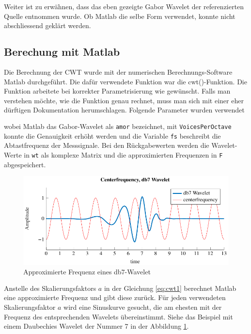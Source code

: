 \begin{refsection}
Weiter ist zu erwähnen, dass das eben gezeigte Gabor Wavelet der referenzierten Quelle entnommen wurde. Ob Matlab die selbe Form verwendet, konnte nicht abschliessend geklärt werden.

\subsection{Berechung mit Matlab}
\label{matlab}
Die Berechnung der CWT wurde mit der numerischen Berechnungs-Software Matlab durchgeführt.
%
Die dafür verwendete Funktion war die cwt()-Funktion.
Die Funktion arbeitete bei korrekter Parametrisierung wie gewünscht.
Falls man verstehen möchte, wie die Funktion genau rechnet, muss man sich mit einer eher dürftigen Dokumentation herumschlagen.
Folgende Parameter wurden verwendet

\label{fig:matlab_code_cwt}
wobei Matlab das Gabor-Wavelet als \texttt{amor} bezeichnet, mit \texttt{VoicesPerOctave} konnte die Genauigkeit erhöht werden und die Variable \texttt{fs} beschreibt die Abtastfrequenz der Messsignale.
Bei den Rückgabewerten werden die Wavelet-Werte in \texttt{wt} als komplexe Matrix und die approximierten Frequenzen in \texttt{F} abgespeichert.
%

\begin{figure}
	\centering
	\includegraphics[width=1\textwidth]{papers/wwt/images/centerf.pdf}
	\caption{Approximierte Frequenz eines db7-Wavelet}
	\label{fig:centerf}
\end{figure}


Anstelle des Skalierungsfaktors $a$ in der Gleichung \eqref{eq:cwt1} berechnet Matlab eine approximierte Frequenz und gibt diese zurück.
Für jeden verwendeten Skalierungsfaktor $a$ wird eine Sinuskurve gesucht, die am ehesten mit der Frequenz des entsprechenden Wavelets übereinstimmt.
Siehe das Beispiel mit einem Daubechies Wavelet der Nummer 7 in der Abbildung \ref{fig:centerf}.



\end{refsection}
